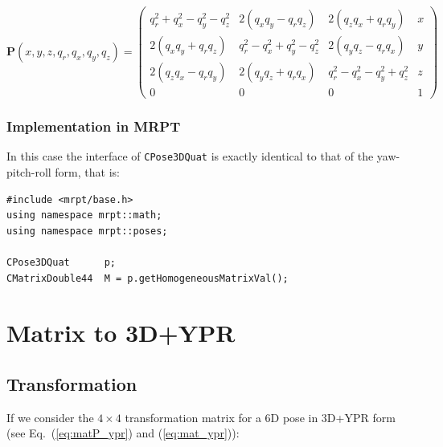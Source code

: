 \documentclass[a4paper,11pt]{report}
\begin{document}
\begin{equation}
\mathbf{P}(x,y,z,q_r,q_x,q_y,q_z)=\left(
  \begin{array}{ccc|c}
   q_r^2+q_x^2-q_y^2-q_z^2 	&  2(q_x q_y - q_r q_z)	&  	2(q_z q_x+q_r q_y)  & x \\
   2(q_x q_y+q_r q_z) 		& q_r^2-q_x^2+q_y^2-q_z^2 	& 2(q_y q_z-q_r q_x) 	& y \\
   2(q_z q_x-q_r q_y) & 2(q_y q_z+q_r q_x)  & q_r^2- q_x^2 - q_y^2 + q_z^2 & z \\ \hline
   0 & 0 & 0& 1
  \end{array}
\right)
\end{equation}



\subsubsection{Implementation in MRPT}

In this case the interface of \texttt{CPose3DQuat} is exactly identical to that 
of the yaw-pitch-roll form, that is:

\begin{lstlisting}
#include <mrpt/base.h> 
using namespace mrpt::math; 
using namespace mrpt::poses; 

CPose3DQuat      p;
CMatrixDouble44  M = p.getHomogeneousMatrixVal();
\end{lstlisting}




\section{Matrix to 3D+YPR   }
\label{sect:mat2ypr}

\subsection{Transformation}

If we consider the $4 \times 4$ transformation matrix for 
a 6D pose in 3D+YPR form (see Eq.~(\ref{eq:matP_ypr}) and (\ref{eq:mat_ypr})):
\end{document}

